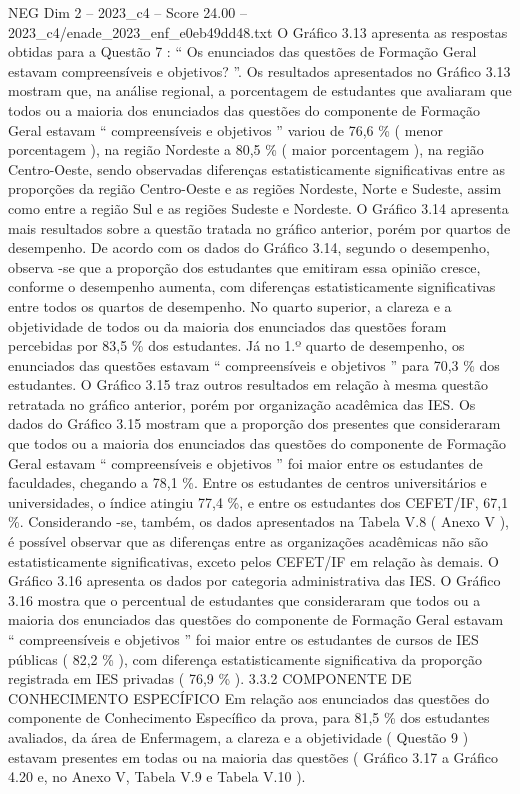 \begin{textsample}{NEG Dim 2 – 2023\_c4 – Score 24.00 – 2023\_c4/enade\_2023\_enf\_e0eb49dd48.txt}
O Gráfico 3.13 apresenta as respostas obtidas para a Questão 7 : “ Os enunciados das questões de Formação Geral estavam compreensíveis e objetivos? ”.
Os resultados apresentados no Gráfico 3.13 mostram que, na análise regional, a porcentagem de estudantes que avaliaram que todos ou a maioria dos enunciados das questões do componente de Formação Geral estavam “ compreensíveis e objetivos ” variou de 76,6 \% ( menor porcentagem ), na região Nordeste a 80,5 \% ( maior porcentagem ), na região Centro-Oeste, sendo observadas diferenças estatisticamente significativas entre as proporções da região Centro-Oeste e as regiões Nordeste, Norte e Sudeste, assim como entre a região Sul e as regiões Sudeste e Nordeste.
O Gráfico 3.14 apresenta mais resultados sobre a questão tratada no gráfico anterior, porém por quartos de desempenho.
De acordo com os dados do Gráfico 3.14, segundo o desempenho, observa -se que a proporção dos estudantes que emitiram essa opinião cresce, conforme o desempenho aumenta, com diferenças estatisticamente significativas entre todos os quartos de desempenho.
No quarto superior, a clareza e a objetividade de todos ou da maioria dos enunciados das questões foram percebidas por 83,5 \% dos estudantes.
Já no 1.º quarto de desempenho, os enunciados das questões estavam “ compreensíveis e objetivos ” para 70,3 \% dos estudantes.
O Gráfico 3.15 traz outros resultados em relação à mesma questão retratada no gráfico anterior, porém por organização acadêmica das IES.
Os dados do Gráfico 3.15 mostram que a proporção dos presentes que consideraram que todos ou a maioria dos enunciados das questões do componente de Formação Geral estavam “ compreensíveis e objetivos ” foi maior entre os estudantes de faculdades, chegando a 78,1 \%.
Entre os estudantes de centros universitários e universidades, o índice atingiu 77,4 \%, e entre os estudantes dos CEFET/IF, 67,1 \%.
Considerando -se, também, os dados apresentados na Tabela V.8 ( Anexo V ), é possível observar que as diferenças entre as organizações acadêmicas não são estatisticamente significativas, exceto pelos CEFET/IF em relação às demais.
O Gráfico 3.16 apresenta os dados por categoria administrativa das IES.
O Gráfico 3.16 mostra que o percentual de estudantes que consideraram que todos ou a maioria dos enunciados das questões do componente de Formação Geral estavam “ compreensíveis e objetivos ” foi maior entre os estudantes de cursos de IES públicas ( 82,2 \% ), com diferença estatisticamente significativa da proporção registrada em IES privadas ( 76,9 \% ). 3.3.2 COMPONENTE DE CONHECIMENTO ESPECÍFICO Em relação aos enunciados das questões do componente de Conhecimento Específico da prova, para 81,5 \% dos estudantes avaliados, da área de Enfermagem, a clareza e a objetividade ( Questão 9 ) estavam presentes em todas ou na maioria das questões ( Gráfico 3.17 a Gráfico 4.20 e, no Anexo V, Tabela V.9 e Tabela V.10 ).

\end{textsample}

